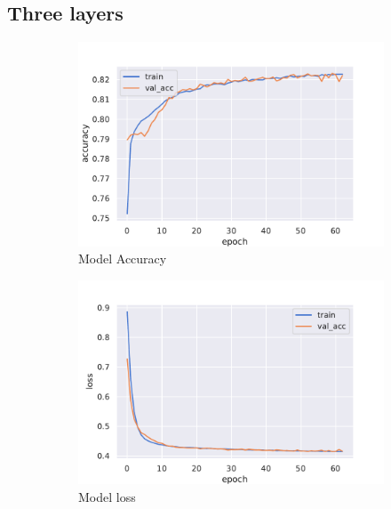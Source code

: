 \subsection{Three layers}
\begin{figure}[H]
     \centering
     \begin{subfigure}[b]{0.3\textwidth}
         \centering
         \includegraphics[width=\textwidth]{figure_3/One_node_three_accuracy.pdf}
         \caption{Model Accuracy}
         \label{fig:y equals x}
     \end{subfigure}
     \hfill
     \begin{subfigure}[b]{0.3\textwidth}
         \centering
         \includegraphics[width=\textwidth]{figure_3/One_node_three_loss.pdf}
         \caption{Model loss}
         \label{fig:three sin x}
     \end{subfigure}
     \hfill
     \begin{subfigure}[b]{0.3\textwidth}

\end{subfigure}
\end{figure}
